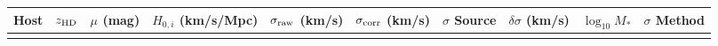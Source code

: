 \documentclass[
]{article}
\newcounter{none} %
\begin{document}
{\def\LTcaptype{none} %
\begin{longtable}[]{@{}
  >{\raggedright\arraybackslash}p{}
  >{\raggedright\arraybackslash}p{}
  >{\raggedright\arraybackslash}p{}
  >{\raggedright\arraybackslash}p{}
  >{\raggedright\arraybackslash}p{}
  >{\raggedright\arraybackslash}p{}
  >{\raggedright\arraybackslash}p{}
  >{\raggedright\arraybackslash}p{}
  >{\raggedright\arraybackslash}p{}
  >{\raggedright\arraybackslash}p{}@{}}
\toprule\noalign{}
\begin{minipage}[b]{\linewidth}\raggedright
Host
\end{minipage} & \begin{minipage}[b]{\linewidth}\raggedright
\(z_{\rm HD}\)
\end{minipage} & \begin{minipage}[b]{\linewidth}\raggedright
\(\mu\) (mag)
\end{minipage} & \begin{minipage}[b]{\linewidth}\raggedright
\(H_{0,i}\) (km/s/Mpc)
\end{minipage} & \begin{minipage}[b]{\linewidth}\raggedright
\(\sigma_{\rm raw}\) (km/s)
\end{minipage} & \begin{minipage}[b]{\linewidth}\raggedright
\(\sigma_{\rm corr}\) (km/s)
\end{minipage} & \begin{minipage}[b]{\linewidth}\raggedright
\(\sigma\) Source
\end{minipage} & \begin{minipage}[b]{\linewidth}\raggedright
\(\delta\sigma\) (km/s)
\end{minipage} & \begin{minipage}[b]{\linewidth}\raggedright
\(\log_{10} M_*\)
\end{minipage} & \begin{minipage}[b]{\linewidth}\raggedright
\(\sigma\) Method
\end{minipage} \\
\midrule\noalign{}
\endhead
\bottomrule\noalign{}

\end{longtable}}
\end{document}
